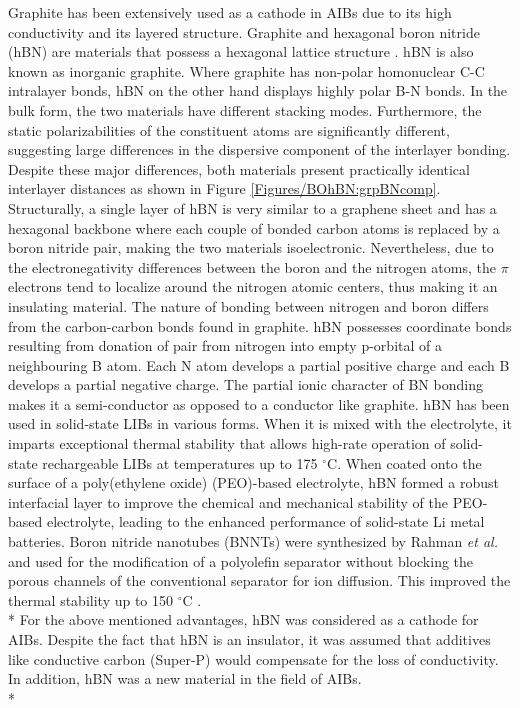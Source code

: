 Graphite has been extensively used as a cathode in AIBs due to its high conductivity and its layered structure. Graphite and hexagonal boron nitride (hBN) are materials that possess a hexagonal lattice structure \cite{hod_graphite_2012}. hBN is also known as inorganic graphite. Where graphite has non-polar homonuclear C-C intralayer bonds, hBN on the other hand displays highly polar B-N bonds. In the bulk form, the two materials have different stacking modes. Furthermore, the static polarizabilities of the constituent atoms are significantly different, suggesting large differences in the dispersive component of the interlayer bonding\cite{song_large_2010, zeng_white_2010}. Despite these major differences, both materials present practically identical interlayer distances as shown in  Figure \ref{Figures/BOhBN:grpBNcomp}. Structurally, a single layer of hBN is very similar to a graphene sheet and has a hexagonal backbone where each couple of bonded carbon atoms is replaced by a boron nitride pair, making the two materials isoelectronic. Nevertheless, due to the electronegativity differences between the boron and the nitrogen atoms, the $\pi$ electrons tend to localize around the nitrogen atomic centers, thus making it an insulating material. The nature of bonding between nitrogen and boron differs from the carbon-carbon bonds found in graphite. hBN possesses coordinate bonds resulting from donation of  pair from nitrogen into empty p-orbital of a neighbouring B atom. Each N atom develops a partial positive charge and each B develops a partial negative charge. The partial ionic character of BN bonding makes it a semi-conductor as opposed to a conductor like graphite. hBN has been used in solid-state LIBs in various forms. When it is mixed with the electrolyte, it imparts exceptional thermal stability that allows high-rate operation of solid-state rechargeable LIBs at temperatures up to 175 $^{\circ}$C\cite{hyun_high}. When coated onto the surface of a poly(ethylene oxide) (PEO)-based electrolyte, hBN formed a robust interfacial layer to improve the chemical and mechanical stability of the PEO-based electrolyte, leading to the enhanced performance of solid-state Li metal batteries\cite{shen_chem}. Boron nitride nanotubes (BNNTs) were synthesized by Rahman \textit{et al.} and used for the modification of a polyolefin separator without blocking the porous channels of the conventional separator for  ion diffusion. This improved the thermal stability up to 150 $^{\circ}$C \cite{rahamn_}.\\*
For the above mentioned advantages, hBN was considered as a cathode for AIBs. Despite the fact that hBN is an insulator, it was assumed that additives like conductive carbon (Super-P) would compensate for the loss of conductivity. In addition, hBN was a new material in the field of AIBs.\\* 

